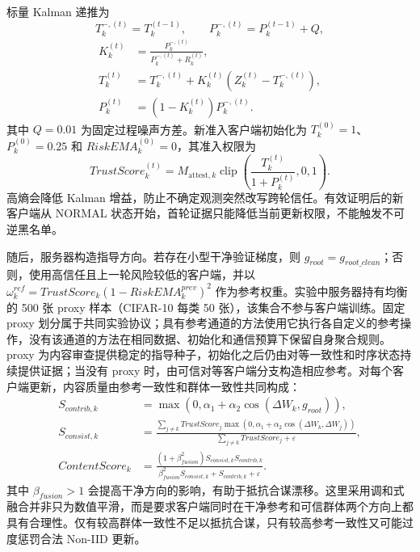 \documentclass[10pt,a4paper,UTF8,fontset=fandol]{ctexart}
\begin{document}
标量 Kalman 递推为
\begin{equation}
    T_k^{-,(t)}=T_k^{(t-1)},\qquad P_k^{-,(t)}=P_k^{(t-1)}+Q,
\end{equation}
\begin{equation}
\begin{aligned}
    K_k^{(t)}&=\frac{P_k^{-,(t)}}{P_k^{-,(t)}+R_k^{(t)}},\\
    T_k^{(t)}&=T_k^{-,(t)}+K_k^{(t)}(Z_k^{(t)}-T_k^{-,(t)}),\\
    P_k^{(t)}&=(1-K_k^{(t)})P_k^{-,(t)}.
\end{aligned}
\end{equation}
其中 $Q=0.01$ 为固定过程噪声方差。新准入客户端初始化为 $T_k^{(0)}=1$、$P_k^{(0)}=0.25$ 和 $RiskEMA_k^{(0)}=0$，其准入权限为
\begin{equation}
    TrustScore_k^{(t)}=M_{\mathrm{attest},k}\operatorname{clip}\!\left(\frac{T_k^{(t)}}{1+P_k^{(t)}},0,1\right).
\end{equation}
高熵会降低 Kalman 增益，防止不确定观测突然改写跨轮信任。有效证明后的新客户端从 NORMAL 状态开始，首轮证据只能降低当前更新权限，不能触发不可逆黑名单。

    随后，服务器构造指导方向。若存在小型干净验证梯度，则 $g_{root}=g_{root\_clean}$；否则，使用高信任且上一轮风险较低的客户端，并以 $\omega_k^{ref}=TrustScore_k(1-RiskEMA_k^{prev})^2$ 作为参考权重。实验中服务器持有均衡的 500 张 proxy 样本（CIFAR-10 每类 50 张），该集合不参与客户端训练。固定 proxy 划分属于共同实验协议；具有参考通道的方法使用它执行各自定义的参考操作，没有该通道的方法在相同数据、初始化和通信预算下保留自身聚合规则。proxy 为内容审查提供稳定的指导种子，初始化之后仍由对等一致性和时序状态持续提供证据；当没有 proxy 时，由可信对等客户端分支构造相应参考。对每个客户端更新，内容质量由参考一致性和群体一致性共同构成：
\begin{align}
    S_{contrib,k}  & =\max(0,\alpha_1+\alpha_2\cos(\Delta W_k,g_{root})),                                  \\
    S_{consist,k}  & =\frac{\sum_{j\ne k}TrustScore_j\max(0,\alpha_1+\alpha_2\cos(\Delta W_k,\Delta W_j))}
    {\sum_{j\ne k}TrustScore_j+\varepsilon},                                                               \\
    ContentScore_k & =\frac{(1+\beta_{fusion}^2)S_{consist,k}S_{contrib,k}}
    {\beta_{fusion}^2S_{consist,k}+S_{contrib,k}+\varepsilon}.
\end{align}
其中 $\beta_{fusion}>1$ 会提高干净方向的影响，有助于抵抗合谋漂移。这里采用调和式融合并非只为数值平滑，而是要求客户端同时在干净参考和可信群体两个方向上都具有合理性。仅有较高群体一致性不足以抵抗合谋，只有较高参考一致性又可能过度惩罚合法 Non-IID 更新。
\end{document}
